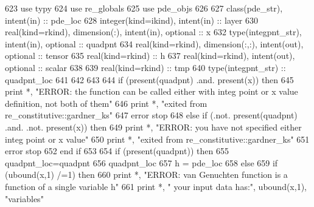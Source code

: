\begin{DoxyCode}
623       \textcolor{keywordtype}{use }typy
624       \textcolor{keywordtype}{use }re_globals
625       \textcolor{keywordtype}{use }pde_objs
626 
627       \textcolor{keywordtype}{class}(pde_str), \textcolor{keywordtype}{intent(in)} :: pde\_loc
628       \textcolor{keywordtype}{integer(kind=ikind)}, \textcolor{keywordtype}{intent(in)} :: layer
630       \textcolor{keywordtype}{real(kind=rkind)}, \textcolor{keywordtype}{dimension(:)}, \textcolor{keywordtype}{intent(in)}, \textcolor{keywordtype}{optional} :: x
632       \textcolor{keywordtype}{type}(integpnt_str), \textcolor{keywordtype}{intent(in)}, \textcolor{keywordtype}{optional} :: quadpnt      
634       \textcolor{keywordtype}{real(kind=rkind)}, \textcolor{keywordtype}{dimension(:,:)}, \textcolor{keywordtype}{intent(out)}, \textcolor{keywordtype}{optional} :: tensor
635       \textcolor{keywordtype}{real(kind=rkind)} :: h
637       \textcolor{keywordtype}{real(kind=rkind)}, \textcolor{keywordtype}{intent(out)}, \textcolor{keywordtype}{optional} :: scalar
638 
639       \textcolor{keywordtype}{real(kind=rkind)} :: tmp
640       \textcolor{keywordtype}{type}(integpnt_str) :: quadpnt\_loc
641       
642   
643 
644       \textcolor{keywordflow}{if} (\textcolor{keyword}{present}(quadpnt) .and. \textcolor{keyword}{present}(x)) \textcolor{keywordflow}{then}
645         print *, \textcolor{stringliteral}{"ERROR: the function can be called either with integ point or x value definition, not both
       of them"}
646         print *, \textcolor{stringliteral}{"exited from re\_constitutive::gardner\_ks"}
647         error stop
648       \textcolor{keywordflow}{else} \textcolor{keywordflow}{if} (.not. \textcolor{keyword}{present}(quadpnt) .and. .not. \textcolor{keyword}{present}(x)) \textcolor{keywordflow}{then}
649         print *, \textcolor{stringliteral}{"ERROR: you have not specified either integ point or x value"}
650         print *, \textcolor{stringliteral}{"exited from re\_constitutive::gardner\_ks"}
651         error stop
652 \textcolor{keywordflow}{      end if}
653       
654       \textcolor{keywordflow}{if} (\textcolor{keyword}{present}(quadpnt)) \textcolor{keywordflow}{then}
655         quadpnt\_loc=quadpnt
656         quadpnt\_loc%
657         h = pde\_loc%
658       \textcolor{keywordflow}{else}
659         \textcolor{keywordflow}{if} (ubound(x,1) /=1) \textcolor{keywordflow}{then}
660           print *, \textcolor{stringliteral}{"ERROR: van Genuchten function is a function of a single variable h"}
661           print *, \textcolor{stringliteral}{"       your input data has:"}, ubound(x,1), \textcolor{stringliteral}{"variables"}

\end{DoxyCode}
